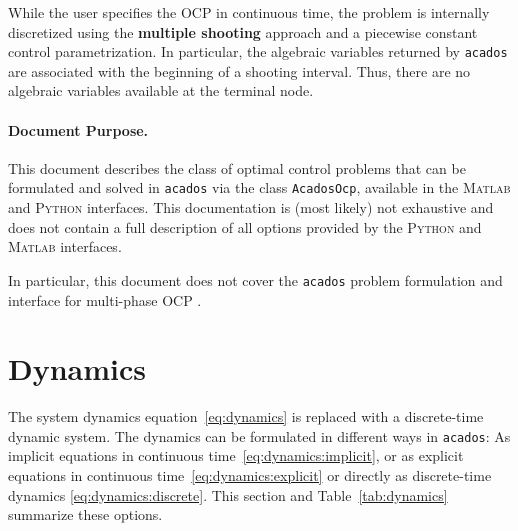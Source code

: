\documentclass[english]{article}
\newcommand{\code}[1]{\texttt{#1}}
\newcommand{\acados}{\texttt{acados}}
\newcommand{\matlab}{\textsc{Matlab}}
\newcommand{\python}{\textsc{Python}}
\begin{document}
While the user specifies the OCP in continuous time, the problem is internally discretized using the \textbf{multiple shooting} approach and a piecewise constant control parametrization.
In particular, the algebraic variables returned by \acados{} are associated with the beginning of a shooting interval.
Thus, there are no algebraic variables available at the terminal node.

%

%
\paragraph{Document Purpose.}
This document describes the class of optimal control problems that can be formulated and solved in \acados{} via the class \texttt{AcadosOcp}, available in the \matlab{} and \python{} interfaces.
This documentation is (most likely) not exhaustive and does not contain a full description of all options provided by the \python{} and \matlab{} interfaces.

In particular, this document does not cover the \acados{} problem formulation and interface for multi-phase OCP \cite{frey2024multi}.




\section{Dynamics}\label{sec:dynamics}
%
%
The system dynamics equation~\eqref{eq:dynamics} is replaced with a discrete-time dynamic system.
The dynamics can be formulated in different ways in \acados:
As implicit equations in continuous time~\eqref{eq:dynamics:implicit}, or as explicit equations in continuous time~\eqref{eq:dynamics:explicit} or directly as discrete-time dynamics \eqref{eq:dynamics:discrete}.
This section and Table~\ref{tab:dynamics} summarize these options.
%
\end{document}
